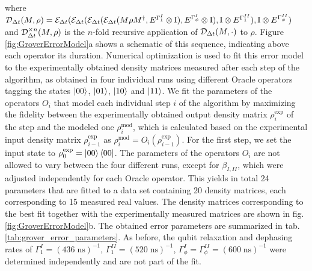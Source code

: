 where $\De_{\Delta t}(M,\rho)=\Er_{\Delta t}(\Er_{\Delta t}(\Er_{\Delta t}(\Er_{\Delta t}(M\rho M^\dagger,E^{\Gamma_1^I}\otimes \mathrm{I}),E^{\Gamma_\phi^I}\otimes \mathrm{I}),\mathrm{I}\otimes E^{\Gamma_1^{II}}),\mathrm{I}\otimes E^{\Gamma_\phi^{II}})$ and $\De_{\Delta t}^{\times n}(M,\rho)$ is the $n$-fold recursive application of $\De_{\Delta t}(M,\cdot)$ to $\rho$. Figure \ref{fig:GroverErrorModel}a shows a schematic of this sequence, indicating above each operator its duration. Numerical optimization is used to fit this error model to the experimentally obtained density matrices measured after each step of the algorithm, as obtained in four individual runs using different Oracle operators tagging the states $\left| 00 \right>$, $\left| 01 \right>$, $\left| 10 \right>$ and $\left| 11 \right>$. We fit the parameters of the operators $O_i$ that model each individual step $i$ of the algorithm by maximizing the fidelity between the experimentally obtained output density matrix $\rho_{i}^\mathrm{exp}$ of the step and the modeled one $\rho_i^\mathrm{mod}$, which is calculated based on the experimental input density matrix $\rho_{i-1}^\mathrm{exp}$ as $\rho_{i}^\mathrm{mod} = O_i(\rho_{i-1}^\mathrm{exp})$. For the first step, we set the input state to $\rho^\mathrm{exp}_0=\left| 00 \right>\left< 00 \right|$. The parameters of the operators $O_i$ are not allowed to vary between the four different runs, except for $\beta_{I,II}$, which were adjusted independently for each Oracle operator. This yields in total 24 parameters that are fitted to a data set containing 20 density matrices, each corresponding to 15 measured real values. The density matrices corresponding to the best fit together with the experimentally measured matrices are shown in fig. \ref{fig:GroverErrorModel}b. The obtained error parameters are summarized in tab. \ref{tab:grover_error_parameters}. As before, the qubit relaxation and dephasing rates of $\Gamma_1^I = (436\;\mathrm{ns})^{-1}$, $\Gamma_1^{II}=(520\;\mathrm{ns})^{-1}$, $\Gamma_\phi^I=\Gamma_\phi^{II}=(600\;\mathrm{ns})^{-1}$ were determined independently and are not part of the fit.

